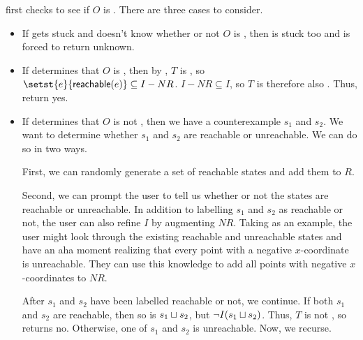 \Helper{} first checks to see if $O$ is . There are three
cases to consider.
\begin{itemize}
  \item
    If \IsIclosed{} gets stuck and doesn't know whether or not $O$ is
    , then \Helper{} is stuck too and is forced to return
    unknown.
  \item
    If \IsIclosed{} determines that $O$ is , then by
    , $T$ is , so
    $\setst{e}{\reachable{e}} \subseteq I - NR$. $I - NR \subseteq I$, so $T$
    is therefore also \Iconfluent{}. Thus, \Helper{} return yes.
  \item
    If \IsIclosed{} determines that $O$ is not , then we
    have a counterexample $s_1$ and $s_2$. We want to determine whether $s_1$
    and $s_2$ are reachable or unreachable. We can do so in two ways.

    First, we can randomly generate a set of reachable states and add them to
    $R$.

    Second, we can prompt the user to tell us whether or not the states are
    reachable or unreachable. In addition to labelling $s_1$ and $s_2$ as
    reachable or not, the user can also refine $I$ by augmenting $NR$. Taking
     as an example, the user might look
    through the existing reachable and unreachable states and have an aha
    moment realizing that every point with a negative $x$-coordinate is
    unreachable. They can use this knowledge to add all points with negative
    $x$-coordinates to $NR$.

    After $s_1$ and $s_2$ have been labelled reachable or not, we continue. If
    both $s_1$ and $s_2$ are reachable, then so is $s_1 \sqcup s_2$, but $\lnot
    I(s_1 \sqcup s_2)$. Thus, $T$ is not \Iconfluent{}, so \Helper{} returns no.
    Otherwise, one of $s_1$ and $s_2$ is unreachable. Now, we recurse.
\end{itemize}

